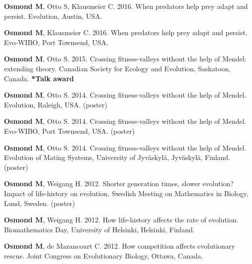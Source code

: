 \documentclass[12pt]{article}
\begin{document}

\textbf{Osmond M}, Otto S, Klausmeier C. 2016. When predators help prey adapt and persist. Evolution, Austin, USA. 

\textbf{Osmond M}, Klausmeier C. 2016. When predators help prey adapt and persist. Evo-WIBO, Port Townsend, USA.

\textbf{Osmond M}, Otto S. 2015. Crossing fitness-valleys without the help of Mendel: extending theory. Canadian Society for Ecology and Evolution, Saskatoon, Canada. \textbf{*Talk award}


\textbf{Osmond M}, Otto S. 2014. Crossing fitness-valleys without the help of Mendel. Evolution, Raleigh, USA. (poster)

\textbf{Osmond M}, Otto S. 2014. Crossing fitness-valleys without the help of Mendel. Evo-WIBO, Port Townsend, USA. (poster)


\textbf{Osmond M}, Otto S. 2014. Crossing fitness-valleys without the help of Mendel. Evolution of Mating Systems, University of Jyv\"askyl\"a, Jyv\"askyl\"a, Finland. (poster)


\textbf{Osmond M}, Weigang H. 2012. Shorter generation times, slower evolution? Impact of life-history on evolution. Swedish Meeting on Mathematics in Biology, Lund, Sweden. (poster)

\textbf{Osmond M}, Weigang H. 2012. How life-history affects the rate of evolution. Biomathematics Day, University of Helsinki, Helsinki, Finland.

\textbf{Osmond M}, de Mazancourt C. 2012. How competition affects evolutionary rescue. Joint Congress on Evolutionary Biology, Ottawa, Canada.
\end{document}

